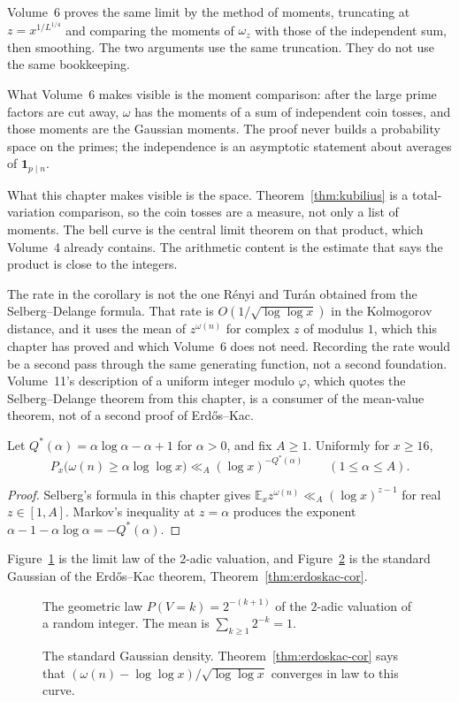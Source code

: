 Volume~6 proves the same limit by the method of moments, truncating at $z=x^{1/L^{1/4}}$ and comparing the moments of $\omega_z$ with those of the independent sum, then smoothing. The two arguments use the same truncation. They do not use the same bookkeeping.

What Volume~6 makes visible is the moment comparison: after the large prime factors are cut away, $\omega$ has the moments of a sum of independent coin tosses, and those moments are the Gaussian moments. The proof never builds a probability space on the primes; the independence is an asymptotic statement about averages of $\mathbf 1_{p\mid n}$.

What this chapter makes visible is the space. Theorem~\ref{thm:kubilius} is a total-variation comparison, so the coin tosses are a measure, not only a list of moments. The bell curve is the central limit theorem on that product, which Volume~4 already contains. The arithmetic content is the estimate that says the product is close to the integers.

The rate in the corollary is not the one R\'enyi and Tur\'an obtained from the Selberg--Delange formula. That rate is $O(1/\sqrt{\log\log x})$ in the Kolmogorov distance, and it uses the mean of $z^{\omega(n)}$ for complex $z$ of modulus $1$, which this chapter has proved and which Volume~6 does not need. Recording the rate would be a second pass through the same generating function, not a second foundation. Volume~11's description of a uniform integer modulo $\varphi$, which quotes the Selberg--Delange theorem from this chapter, is a consumer of the mean-value theorem, not of a second proof of Erd\H os--Kac.

\begin{proposition}\label{prop:chernoffomega}
Let $Q^*(\alpha)=\alpha\log\alpha-\alpha+1$ for $\alpha>0$, and fix $A\ge1$. Uniformly for $x\ge16$,
\[
P_x\bigl(\omega(n)\ge\alpha\log\log x\bigr)\ll_A(\log x)^{-Q^*(\alpha)}\qquad(1\le\alpha\le A).
\]
\end{proposition}
\begin{proof}
Selberg's formula in this chapter gives $\mathbb E_x z^{\omega(n)}\ll_A(\log x)^{z-1}$ for real $z\in[1,A]$. Markov's inequality at $z=\alpha$ produces the exponent $\alpha-1-\alpha\log\alpha=-Q^*(\alpha)$.
\end{proof}

Figure~\ref{fig:v15c03-valuation} is the limit law of the \(2\)-adic valuation, and Figure~\ref{fig:v15c03-gaussian} is the standard Gaussian of the Erd\H{o}s--Kac theorem, Theorem~\ref{thm:erdoskac-cor}.

\begin{figure}[ht]
\centering
{}
\caption{The geometric law \(P(V=k)=2^{-(k+1)}\) of the \(2\)-adic valuation of a random integer. The mean is \(\sum_{k\ge1}2^{-k}=1\).}
\label{fig:v15c03-valuation}
\end{figure}

\begin{figure}[ht]
\centering
{}
\caption{The standard Gaussian density. Theorem~\ref{thm:erdoskac-cor} says that \((\omega(n)-\log\log x)/\sqrt{\log\log x}\) converges in law to this curve.}
\label{fig:v15c03-gaussian}
\end{figure}
